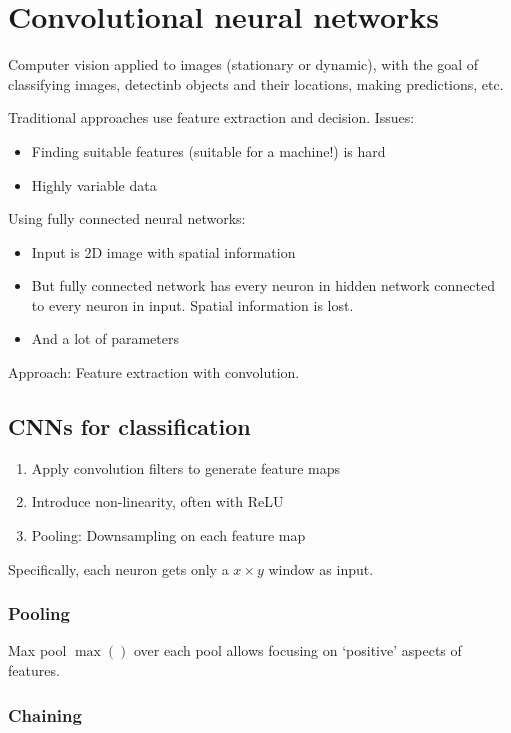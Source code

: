 \section{Convolutional neural networks}

Computer vision applied to images (stationary or dynamic), with the goal of
classifying images, detectinb objects and their locations, making predictions,
etc.

Traditional approaches use feature extraction and decision. Issues:
\begin{itemize}
		\item Finding suitable features (suitable for a machine!) is hard
		\item Highly variable data
\end{itemize}

Using fully connected neural networks:
\begin{itemize}
		\item Input is 2D image with spatial information
		\item But fully connected network has every neuron in hidden network
				connected to every neuron in input. Spatial information is
				lost.
		\item And a lot of parameters
\end{itemize}

Approach: Feature extraction with convolution.

\subsection{CNNs for classification}

\begin{enumerate}
		\item Apply convolution filters to generate feature maps
		\item Introduce non-linearity, often with ReLU
		\item Pooling: Downsampling on each feature map
\end{enumerate}

Specifically, each neuron gets only a $x \times y$ window as input.

\subsubsection{Pooling}

Max pool $\max()$ over each pool allows focusing on `positive' aspects of
features.

\subsubsection{Chaining}

